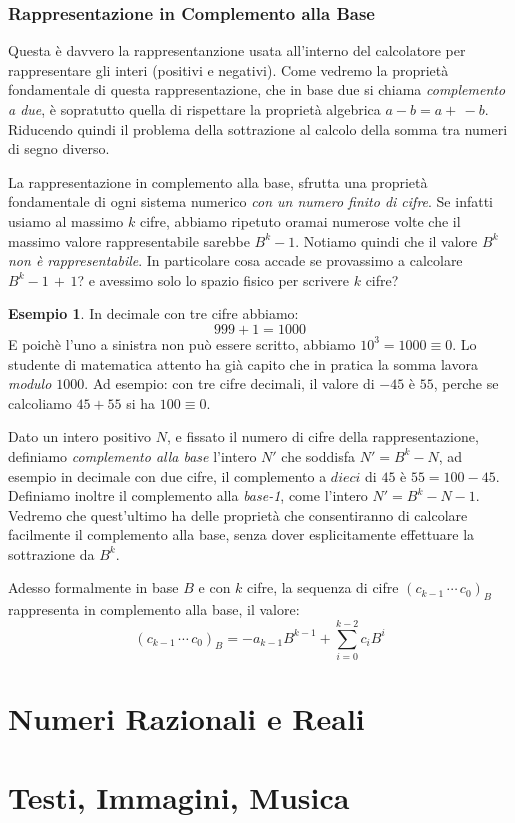 \documentclass[a4paper]{book}
\theoremstyle{definition}
\newtheorem{ex}{Esempio}
\begin{document}
\subsubsection{Rappresentazione in Complemento alla Base}

Questa è davvero la rappresentanzione usata all'interno del calcolatore per
rappresentare gli interi (positivi e negativi). Come vedremo la proprietà
fondamentale di questa rappresentazione, che in base due si chiama \emph{complemento a due}, è sopratutto quella di rispettare la proprietà algebrica $a - b = a +\, -b$. Riducendo quindi il problema della sottrazione
al calcolo della somma tra numeri di segno diverso.

La rappresentazione in complemento alla base, sfrutta una proprietà fondamentale
di ogni sistema numerico \emph{con un numero finito di cifre}. Se infatti usiamo al massimo $k$ cifre, abbiamo ripetuto oramai numerose volte che il massimo valore rappresentabile sarebbe $B^k-1$. Notiamo quindi che il valore
$B^k$ \emph{non è rappresentabile}. In particolare cosa accade se provassimo a calcolare $B^k-1\,+\,1$? e avessimo solo lo spazio fisico per scrivere $k$ cifre?

\begin{ex} In decimale con tre cifre abbiamo:
	\[ \boxed{9}\boxed{9}\boxed{9} + 1 = 1\boxed{0}\boxed{0}\boxed{0} \]
E poichè l'uno a sinistra non può essere scritto, abbiamo $10^3 = 1000 \equiv 0$. Lo studente di matematica attento ha già capito che in pratica la somma lavora \emph{modulo $1000$}. Ad esempio: con tre cifre decimali, il valore di $-45$ è $55$, perche se calcoliamo $45 + 55$ si ha $100 \equiv 0$.
\end{ex}

Dato un intero positivo $N$, e fissato il numero di cifre della rappresentazione, definiamo \emph{complemento alla base} l'intero $N'$
che soddisfa $N'= B^k-N$, ad esempio in decimale con due cifre,
il complemento a $dieci$ di $45$ è $55 = 100-45$. Definiamo inoltre il complemento alla \emph{base-1}, come l'intero $N' = B^k-N-1$. Vedremo che
quest'ultimo ha delle proprietà che consentiranno di calcolare facilmente il complemento alla base, senza dover esplicitamente effettuare la sottrazione da $B^k$.

Adesso formalmente in base $B$ e con $k$ cifre, la sequenza di cifre $(c_{k-1}\,\cdots\,c_{0})_B$ rappresenta in complemento alla base, il valore:
\[ (c_{k-1}\,\cdots\,c_{0})_B = -a_{k-1}B^{k-1}+\sum_{i=0}^{k-2} c_iB^i \] 


\section{Numeri Razionali e Reali}

\section{Testi, Immagini, Musica}
\end{document}
